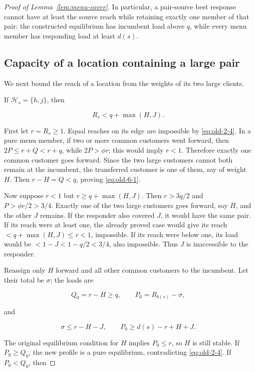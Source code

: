 \documentclass[11pt]{amsart}
\numberwithin{equation}{section}
\theoremstyle{definition}
\begin{document}
\begin{proof}[Proof of Lemma~\ref{lem:menu-cover}]
In particular, a pair-source best response cannot have at least the source reach while retaining exactly one member of that pair: the constructed equilibrium has incumbent load above \(q\), while every menu member has responding load at least \(d(s)\).


\subsection{Capacity of a location containing a large pair}\label{capacity-of-a-location-containing-a-large-pair}
We next bound the reach of a location from the weights of its two large clients.


If \(\mathcal H_s=\{h,j\}\), then

\begin{equation}
R_s<q+\max(H,J). \label{eq:old-6-1}
\end{equation}

First let \(r=R_s\ge1\). Equal reaches on its edge are impossible by \eqref{eq:old-2-4}. In a pure menu member, if two or more common customers went forward, then \(2P\le r+Q<r+q\), while \(2P>\phi r\); this would imply \(r<1\). Therefore exactly one common customer goes forward. Since the two large customers cannot both remain at the incumbent, the transferred customer is one of them, say of weight \(H\). Then \(r-H=Q<q\), proving \eqref{eq:old-6-1}.

Now suppose \(r<1\) but \(r\ge q+\max(H,J)\). Then \(r>3q/2\) and \(P>\phi r/2>3/4\). Exactly one of the two large customers goes forward, say \(H\), and the other \(J\) remains. If the responder also covered \(J\), it would have the same pair. If its reach were at least one, the already proved case would give its reach \(<q+\max(H,J)\le r<1\), impossible. If its reach were below one, its load would be \(<1-J<1-q/2<3/4\), also impossible. Thus \(J\) is inaccessible to the responder.

Reassign only \(H\) forward and all other common customers to the incumbent. Let their total be \(\sigma\); the loads are

\[
Q_0=r-H\ge q,\qquad P_0=R_{b(s)}-\sigma,
\]

and

\[
\sigma\le r-H-J,\qquad P_0\ge d(s)-r+H+J.
\]

The original equilibrium condition for \(H\) implies \(P_0\le r\), so \(H\) is still stable. If \(P_0\ge Q_0\), the new profile is a pure equilibrium, contradicting \eqref{eq:old-2-4}. If \(P_0<Q_0\), then


\end{proof}
\end{document}
